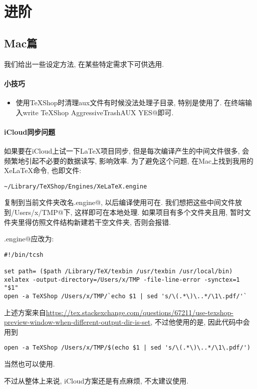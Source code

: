 \chapter{进阶}

\section{Mac篇}

我们给出一些设定方法, 在某些特定需求下可供选用.

\subsubsection{小技巧}

\begin{itemize}
    \item   使用TeXShop时清理aux文件有时候没法处理子目录, 
    特别是使用了. 在终端输入\verb@defaults write TeXShop AggressiveTrashAUX YES@即可.
\end{itemize}

\subsubsection{iCloud同步问题}

如果要在iCloud上试一下\LaTeX{}项目同步, 但是每次编译产生的中间文件很多, 会频繁地引起不必要的数据读写, 影响效率.
为了避免这个问题, 在Mac上找到我用的XeLaTeX命令, 也即文件:
\begin{Verbatim}
~/Library/TeXShop/Engines/XeLaTeX.engine
\end{Verbatim}
复制到当前文件夹改名\verb@CLOUD.engine@, 以后编译使用可在. 
我们想把这些中间文件放到\verb@/Users/x/TMP@下, 这样即可在本地处理. 如果项目有多个文件夹且用, 
暂时文件夹里得仿照文件结构新建若干空文件夹, 否则会报错.

\verb@CLOUD.engine@应改为:
\begin{Verbatim}
#!/bin/tcsh

set path= ($path /Library/TeX/texbin /usr/texbin /usr/local/bin)
xelatex -output-directory=/Users/x/TMP -file-line-error -synctex=1 "$1"
open -a TeXShop /Users/x/TMP/`echo $1 | sed 's/\(.*\)\..*/\1\.pdf/'`
\end{Verbatim}
上述方案来自\url{https://tex.stackexchange.com/questions/67211/use-texshop-preview-window-when-different-output-dir-is-set}, 
不过他使用的是\verb@tcsh@, 因此代码中会用到
\begin{Verbatim}
open -a TeXShop /Users/x/TMP/$(echo $1 | sed 's/\(.*\)\..*/\1\.pdf/')
\end{Verbatim}
当然也可以使用. 

不过从整体上来说, iCloud方案还是有点麻烦, 不太建议使用.